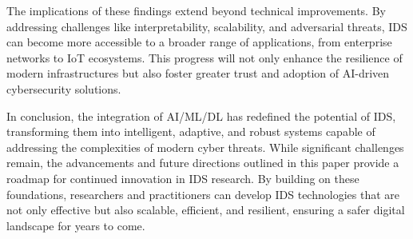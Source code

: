 The implications of these findings extend beyond technical improvements. By addressing challenges like interpretability, scalability, and adversarial threats, IDS can become more accessible to a broader range of applications, from enterprise networks to IoT ecosystems. This progress will not only enhance the resilience of modern infrastructures but also foster greater trust and adoption of AI-driven cybersecurity solutions.

In conclusion, the integration of AI/ML/DL has redefined the potential of IDS, transforming them into intelligent, adaptive, and robust systems capable of addressing the complexities of modern cyber threats. While significant challenges remain, the advancements and future directions outlined in this paper provide a roadmap for continued innovation in IDS research. By building on these foundations, researchers and practitioners can develop IDS technologies that are not only effective but also scalable, efficient, and resilient, ensuring a safer digital landscape for years to come.